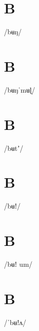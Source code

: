 \documentclass[10pt,a4paper,twoside]{book}
\begin{document}
\section*{B}

\begin{multicols}{3}
 {/bʉŋ/} {}
\end{multicols}

\section*{B}

\begin{multicols}{3}
 {/bʉŋˈmʉɭ/} {}
\end{multicols}

\section*{B}

\begin{multicols}{3}
 {/bʉtʼ/} {}
\end{multicols}

\section*{B}

\begin{multicols}{3}
 {/bʉǃ/} {}
\end{multicols}

\section*{B}

\begin{multicols}{3}
 {/bʉǃ um/} {}
\end{multicols}

\section*{B}

\begin{multicols}{3}
 {/ˈbʉǃʌ/} {}
\end{multicols}
\end{document}
